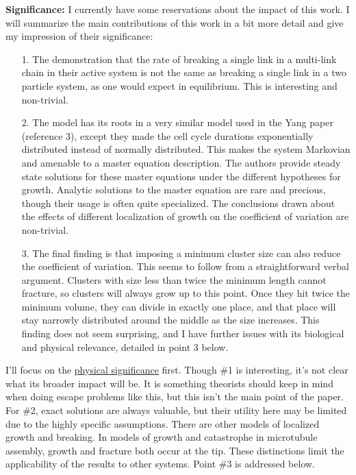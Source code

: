 \documentclass[12pt,oneside,letterpaper]{article}
\begin{document}
\textbf{Significance:} I currently have some reservations about the impact of this work. I will summarize the main contributions of this work in a bit more detail and give my impression of their significance:
\begin{itemize}
	\item[1.] The demonstration that the rate of breaking a single link in a multi-link chain in their active system is not the same as breaking a single link in a two particle system, as one would expect in equilibrium. This is interesting and non-trivial.
	
	\item[2.] The model has its roots in a very similar model used in the Yang paper (reference 3), except they made the cell cycle durations exponentially distributed instead of normally distributed. This makes the system Markovian and amenable to a master equation description. The authors provide steady state solutions for these master equations under the different hypotheses for growth. Analytic solutions to the master equation are rare and precious, though their usage is often quite specialized. The conclusions drawn about the effects of different localization of growth on the coefficient of variation are non-trivial.
	
	\item[3.] The final finding is that imposing a minimum cluster size can also reduce the coefficient of variation. This seems to follow from a straightforward verbal argument. Clusters with size less than twice the minimum length cannot fracture, so clusters will always grow up to this point. Once they hit twice the minimum volume, they can divide in exactly one place, and that place will stay narrowly distributed around the middle as the size increases. This finding does not seem surprising, and I have further issues with its biological and physical relevance, detailed in point 3 below.
\end{itemize}
I'll focus on the \underline{physical significance} first. Though \#1 is interesting, it's not clear what its broader impact will be. It is something theorists should keep in mind when doing escape problems like this, but this isn't the main point of the paper. For \#2, exact solutions are always valuable, but their utility here may be limited due to the highly specific assumptions. There are other models of localized growth and breaking. In models of growth and catastrophe in microtubule assembly, growth and fracture both occur at the tip. These distinctions limit the applicability of the results to other systems. Point \#3 is addressed below. 
\end{document}
